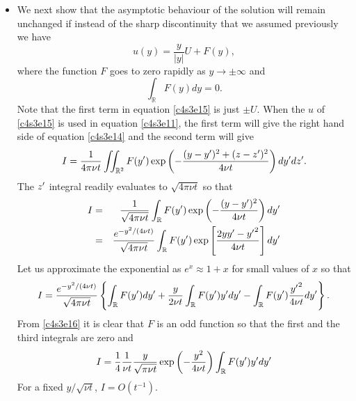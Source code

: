 \begin{itemize}
\item We next show that the asymptotic behaviour of the solution will remain unchanged if instead of the
sharp discontinuity that we assumed previously we have 
\begin{equation}\label{c4s3e15}
u(y) = \frac{y}{|y|}U + F(y),
\end{equation}
where the function $F$ goes to zero rapidly as $y \rightarrow \pm\infty$ and 
\begin{equation}\label{c4s3e16}
\int_\mathbb{R} F(y)dy = 0.
\end{equation}
Note that the first term in equation \eqref{c4s3e15} is just $\pm U$. When the $u$ of \eqref{c4s3e15} 
is used in equation \eqref{c4s3e11}, the first term will give the right hand side of equation
\eqref{c4s3e14} and the second term will give
\[
I = \frac{1}{4\pi\nu t}\iint_{\mathbb{R}^2}F(y^\prime)\exp\left(-\frac{(y - y^\prime)^2 + (z - z^\prime)^2}{4\nu t}\right)dy^\prime dz^\prime.
\]
The $z^\prime$ integral readily evaluates to $\sqrt{4\pi\nu t}$ so that
\begin{eqnarray*}
I &=& \frac{1}{\sqrt{4\pi\nu t}}\int_\mathbb{R}F(y^\prime)\exp\left(-\frac{(y - y^\prime)^2}{4\nu t}\right)dy^\prime \\
&=& \frac{e^{-y^2/(4\nu t)}}{\sqrt{4\pi\nu t}}\int_\mathbb{R}F(y^\prime)\exp\left[\frac{2yy^\prime - {y^\prime}^2}{4\nu t}\right]dy^\prime
\end{eqnarray*}
Let us approximate the exponential as $e^x \approx 1 + x$ for small values of $x$ so that
\[
I = \frac{e^{-y^2/(4\nu t)}}{\sqrt{4\pi\nu t}}\left\{\int_\mathbb{R}F(y^\prime)dy^\prime + \frac{y}{2\nu t}\int_\mathbb{R}F(y^\prime)y^\prime dy^\prime - \int_\mathbb{R}F(y^\prime)\frac{{y^\prime}^2}{4\nu t}dy^\prime\right\}.
\]
From \eqref{c4s3e16} it is clear that $F$ is an odd function so that the first and the third integrals
are zero and
\[
I = \frac{1}{4}\frac{1}{\nu t}\frac{y}{\sqrt{\pi\nu t}}\exp\left(-\frac{y^2}{4\nu t}\right)\int_\mathbb{R}F(y^\prime)y^\prime dy^\prime 
\]
For a fixed $y/\sqrt{\nu t}$, $I = O(t^{-1})$.


\end{itemize}
